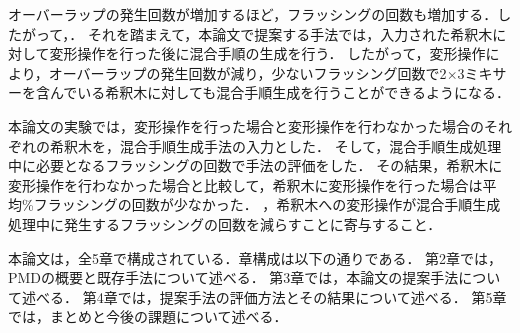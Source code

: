 オーバーラップの発生回数が増加するほど，フラッシングの回数も増加する．したがって，． それを踏まえて，本論文で提案する手法では，入力された希釈木に対して変形操作を行った後に混合手順の生成を行う．
したがって，変形操作により，オーバーラップの発生回数が減り，少ないフラッシング回数で2$\times$3ミキサーを含んでいる希釈木に対しても混合手順生成を行うことができるようになる．

本論文の実験では，変形操作を行った場合と変形操作を行わなかった場合のそれぞれの希釈木を，混合手順生成手法の入力とした．
そして，混合手順生成処理中に必要となるフラッシングの回数で手法の評価をした．
その結果，希釈木に変形操作を行わなかった場合と比較して，希釈木に変形操作を行った場合は平均\%フラッシングの回数が少なかった．
，希釈木への変形操作が混合手順生成処理中に発生するフラッシングの回数を減らすことに寄与すること．

本論文は，全5章で構成されている．章構成は以下の通りである．
第2章では，PMDの概要と既存手法について述べる．
第3章では，本論文の提案手法について述べる．
第4章では，提案手法の評価方法とその結果について述べる．
第5章では，まとめと今後の課題について述べる．


